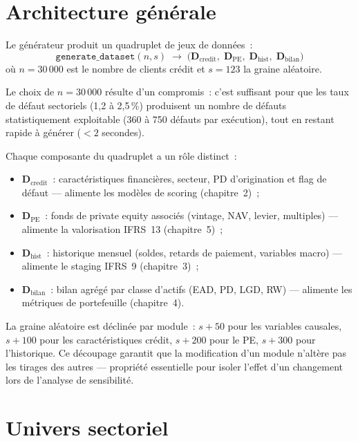 \documentclass[12pt, a4paper, twoside, openright]{report}
\theoremstyle{definition}
\begin{document}
\section{Architecture générale}
\label{sec:donnees:architecture}

Le générateur produit un quadruplet de jeux de données~:
%
\begin{equation}
\label{eq:generate_dataset}
\texttt{generate\_dataset}(n, s) \;\to\; \bigl(\mathbf{D}_{\text{credit}},\; \mathbf{D}_{\text{PE}},\; \mathbf{D}_{\text{hist}},\; \mathbf{D}_{\text{bilan}}\bigr)
\end{equation}
%
où $n = 30\,000$ est le nombre de clients crédit et $s = 123$ la graine aléatoire.

Le choix de $n = 30\,000$ résulte d'un compromis~: c'est suffisant pour que les taux de défaut sectoriels (1{,}2 à 2{,}5\,\%) produisent un nombre de défauts statistiquement exploitable (360 à 750 défauts par exécution), tout en restant rapide à générer ($< 2$ secondes).

Chaque composante du quadruplet a un rôle distinct~:
\begin{itemize}[nosep]
  \item $\mathbf{D}_{\text{credit}}$~: caractéristiques financières, secteur, PD d'origination et flag de défaut --- alimente les modèles de scoring (chapitre~2)~;
  \item $\mathbf{D}_{\text{PE}}$~: fonds de private equity associés (vintage, NAV, levier, multiples) --- alimente la valorisation IFRS~13 (chapitre~5)~;
  \item $\mathbf{D}_{\text{hist}}$~: historique mensuel (soldes, retards de paiement, variables macro) --- alimente le staging IFRS~9 (chapitre~3)~;
  \item $\mathbf{D}_{\text{bilan}}$~: bilan agrégé par classe d'actifs (EAD, PD, LGD, RW) --- alimente les métriques de portefeuille (chapitre~4).
\end{itemize}

La graine aléatoire est déclinée par module~: $s + 50$ pour les variables causales, $s + 100$ pour les caractéristiques crédit, $s + 200$ pour le PE, $s + 300$ pour l'historique.
Ce découpage garantit que la modification d'un module n'altère pas les tirages des autres --- propriété essentielle pour isoler l'effet d'un changement lors de l'analyse de sensibilité.


\section{Univers sectoriel}
\label{sec:donnees:secteurs}
\end{document}
